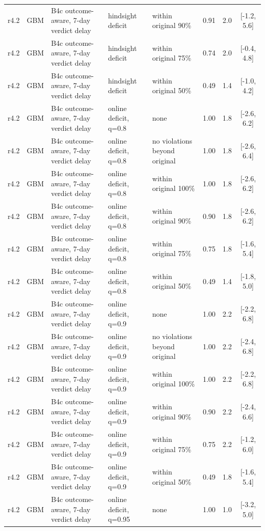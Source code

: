 \documentclass[10pt,onecolumn,letterpaper]{article}
\begin{document}
\begin{longtable}{lllp{4.2cm}p{3.4cm}ccc}
r4.2 & GBM & B4c outcome-aware, 7-day verdict delay & hindsight deficit & within original 90\% & 0.91 & 2.0 & [-1.2, 5.6] \\
r4.2 & GBM & B4c outcome-aware, 7-day verdict delay & hindsight deficit & within original 75\% & 0.74 & 2.0 & [-0.4, 4.8] \\
r4.2 & GBM & B4c outcome-aware, 7-day verdict delay & hindsight deficit & within original 50\% & 0.49 & 1.4 & [-1.0, 4.2] \\
r4.2 & GBM & B4c outcome-aware, 7-day verdict delay & online deficit, q=0.8 & none & 1.00 & 1.8 & [-2.6, 6.2] \\
r4.2 & GBM & B4c outcome-aware, 7-day verdict delay & online deficit, q=0.8 & no violations beyond original & 1.00 & 1.8 & [-2.6, 6.4] \\
r4.2 & GBM & B4c outcome-aware, 7-day verdict delay & online deficit, q=0.8 & within original 100\% & 1.00 & 1.8 & [-2.6, 6.2] \\
r4.2 & GBM & B4c outcome-aware, 7-day verdict delay & online deficit, q=0.8 & within original 90\% & 0.90 & 1.8 & [-2.6, 6.2] \\
r4.2 & GBM & B4c outcome-aware, 7-day verdict delay & online deficit, q=0.8 & within original 75\% & 0.75 & 1.8 & [-1.6, 5.4] \\
r4.2 & GBM & B4c outcome-aware, 7-day verdict delay & online deficit, q=0.8 & within original 50\% & 0.49 & 1.4 & [-1.8, 5.0] \\
r4.2 & GBM & B4c outcome-aware, 7-day verdict delay & online deficit, q=0.9 & none & 1.00 & 2.2 & [-2.2, 6.8] \\
r4.2 & GBM & B4c outcome-aware, 7-day verdict delay & online deficit, q=0.9 & no violations beyond original & 1.00 & 2.2 & [-2.4, 6.8] \\
r4.2 & GBM & B4c outcome-aware, 7-day verdict delay & online deficit, q=0.9 & within original 100\% & 1.00 & 2.2 & [-2.2, 6.8] \\
r4.2 & GBM & B4c outcome-aware, 7-day verdict delay & online deficit, q=0.9 & within original 90\% & 0.90 & 2.2 & [-2.4, 6.6] \\
r4.2 & GBM & B4c outcome-aware, 7-day verdict delay & online deficit, q=0.9 & within original 75\% & 0.75 & 2.2 & [-1.2, 6.0] \\
r4.2 & GBM & B4c outcome-aware, 7-day verdict delay & online deficit, q=0.9 & within original 50\% & 0.49 & 1.8 & [-1.6, 5.4] \\
r4.2 & GBM & B4c outcome-aware, 7-day verdict delay & online deficit, q=0.95 & none & 1.00 & 1.0 & [-3.2, 5.0] \\

\end{longtable}
\end{document}
